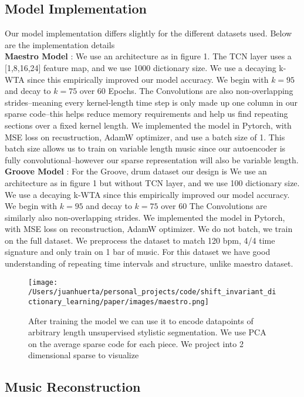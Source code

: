 \documentclass[11pt,a4paper]{article}
\begin{document}
\subsection{Model Implementation}
Our model implementation differs slightly for the different datasets used. Below are the implementation details \\
\textbf{Maestro Model} : We use an architecture as in figure 1. The TCN layer uses a [1,8,16,24] feature map, and we use 1000 dictionary size. We use a decaying k-WTA since this empirically improved our model accuracy. We begin with $k=95$ and decay to $k=75$ over $60$ Epochs. The Convolutions are also non-overlapping strides--meaning every kernel-length time step is only made up one column in our sparse code--this helps reduce memory requirements and help us find repeating sections over a fixed kernel length. We implemented the model in Pytorch, with MSE loss on recustruction, AdamW optimizer, and use a batch size of 1. This batch size allows us to train on variable length music since our autoencoder is fully convolutional--however our sparse representation will also be variable length. \\
\textbf{Groove Model}  : For the Groove, drum dataset our design is We use an architecture as in figure 1 but without TCN layer, and we use 100 dictionary size. We use a decaying k-WTA since this empirically improved our model accuracy. We begin with $k=95$ and decay to $k=75$ over $60$ The Convolutions are similarly also non-overlapping strides. We implemented the model in Pytorch, with MSE loss on reconstruction, AdamW optimizer. We do not batch, we train on the full dataset. We  preprocess the dataset to match 120 bpm, 4/4 time signature and only train on 1 bar of music.  For this dataset we have good understanding of repeating time intervals and structure, unlike maestro dataset. 


\begin{figure*}[ht]
  \texttt{[image: /Users/juanhuerta/personal\_projects/code/shift\_invariant\_dictionary\_learning/paper/images/maestro.png]}
  \caption{After training the model we can use it to encode datapoints of arbitrary length unsupervised stylistic segmentation. We use PCA on the average sparse code for each piece. We project into 2 dimensional sparse to visualize }
  \label{fig:boat1}
\end{figure*}


\subsection{Music Reconstruction}
\label{ssec:first}
\end{document}
